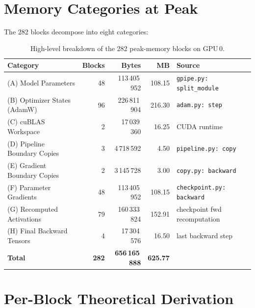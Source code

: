 \documentclass[11pt,a4paper]{article}
\begin{document}
\section{Memory Categories at Peak}
\label{sec:categories}

The 282 blocks decompose into eight categories:

\begin{table}[h]
\centering
\caption{High-level breakdown of the 282 peak-memory blocks on GPU\,0.}
\label{tab:categories}
\begin{tabular}{lrrrl}
\toprule
\textbf{Category} & \textbf{Blocks} & \textbf{Bytes} & \textbf{MB} & \textbf{Source} \\
\midrule
(A) Model Parameters           & 48  & 113\,405\,952 & 108.15 & \texttt{gpipe.py: split\_module} \\
(B) Optimizer States (AdamW)   & 96  & 226\,811\,904 & 216.30 & \texttt{adam.py: step} \\
(C) cuBLAS Workspace           & 2   & 17\,039\,360  & 16.25  & CUDA runtime \\
(D) Pipeline Boundary Copies   & 3   & 4\,718\,592   & 4.50   & \texttt{pipeline.py: copy} \\
(E) Gradient Boundary Copies   & 2   & 3\,145\,728   & 3.00   & \texttt{copy.py: backward} \\
(F) Parameter Gradients        & 48  & 113\,405\,952 & 108.15 & \texttt{checkpoint.py: backward} \\
(G) Recomputed Activations     & 79  & 160\,333\,824 & 152.91 & checkpoint fwd recomputation \\
(H) Final Backward Tensors     & 4   & 17\,304\,576  & 16.50  & last backward step \\
\midrule
\textbf{Total}                  & \textbf{282} & \textbf{656\,165\,888} & \textbf{625.77} & \\
\bottomrule
\end{tabular}
\end{table}

\section{Per-Block Theoretical Derivation}
\label{sec:derivation}
\end{document}
